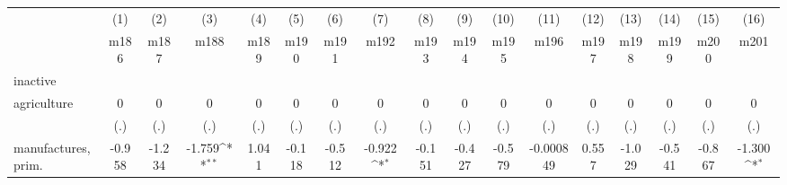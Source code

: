 {
\def\sym#1{\ifmmode^{#1}\else\(^{#1}\)\fi}
\begin{tabular}{l*{16}{c}}
\hline\hline
                    &\multicolumn{1}{c}{(1)}&\multicolumn{1}{c}{(2)}&\multicolumn{1}{c}{(3)}&\multicolumn{1}{c}{(4)}&\multicolumn{1}{c}{(5)}&\multicolumn{1}{c}{(6)}&\multicolumn{1}{c}{(7)}&\multicolumn{1}{c}{(8)}&\multicolumn{1}{c}{(9)}&\multicolumn{1}{c}{(10)}&\multicolumn{1}{c}{(11)}&\multicolumn{1}{c}{(12)}&\multicolumn{1}{c}{(13)}&\multicolumn{1}{c}{(14)}&\multicolumn{1}{c}{(15)}&\multicolumn{1}{c}{(16)}\\
                    &\multicolumn{1}{c}{m186}&\multicolumn{1}{c}{m187}&\multicolumn{1}{c}{m188}&\multicolumn{1}{c}{m189}&\multicolumn{1}{c}{m190}&\multicolumn{1}{c}{m191}&\multicolumn{1}{c}{m192}&\multicolumn{1}{c}{m193}&\multicolumn{1}{c}{m194}&\multicolumn{1}{c}{m195}&\multicolumn{1}{c}{m196}&\multicolumn{1}{c}{m197}&\multicolumn{1}{c}{m198}&\multicolumn{1}{c}{m199}&\multicolumn{1}{c}{m200}&\multicolumn{1}{c}{m201}\\
\hline
inactive            &                     &                     &                     &                     &                     &                     &                     &                     &                     &                     &                     &                     &                     &                     &                     &                     \\
agriculture         &           0         &           0         &           0         &           0         &           0         &           0         &           0         &           0         &           0         &           0         &           0         &           0         &           0         &           0         &           0         &           0         \\
                    &         (.)         &         (.)         &         (.)         &         (.)         &         (.)         &         (.)         &         (.)         &         (.)         &         (.)         &         (.)         &         (.)         &         (.)         &         (.)         &         (.)         &         (.)         &         (.)         \\
[1em]
manufactures, prim. &      -0.958         &      -1.234         &      -1.759\sym{**} &       1.041         &      -0.118         &      -0.512         &      -0.922\sym{*}  &      -0.151         &      -0.427         &      -0.579         &   -0.000849         &       0.557         &      -1.029         &      -0.541         &      -0.867         &      -1.300\sym{*}  \\

\end{tabular}}
